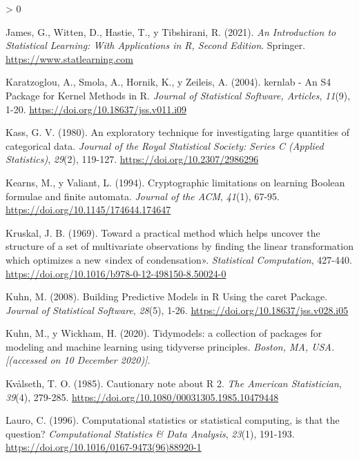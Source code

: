 \documentclass[
  spanish,
]{book}
\theoremstyle{break}
\newlength{\cslhangindent}
\newenvironment{CSLReferences}[2] %
 {%
  \setlength{\parindent}{0pt}
  \ifodd #1 \everypar{\setlength{\hangindent}{\cslhangindent}}\ignorespaces\fi
  \ifnum #2 > 0
  \setlength{\parskip}{#2\baselineskip}
  \fi
 }%
 {}
\theoremstyle{definition}
\theoremstyle{definition}
\theoremstyle{definition}
\theoremstyle{definition}
\theoremstyle{remark}
\begin{document}
\begin{CSLReferences}{1}{0}
\leavevmode\hypertarget{ref-james2021introduction}{}%
James, G., Witten, D., Hastie, T., y Tibshirani, R. (2021). \emph{An Introduction to Statistical Learning: With Applications in R, Second Edition}. Springer. \url{https://www.statlearning.com}

\leavevmode\hypertarget{ref-kernlab2004}{}%
Karatzoglou, A., Smola, A., Hornik, K., y Zeileis, A. (2004). kernlab - An S4 Package for Kernel Methods in R. \emph{Journal of Statistical Software, Articles}, \emph{11}(9), 1-20. \url{https://doi.org/10.18637/jss.v011.i09}

\leavevmode\hypertarget{ref-kass1980exploratory}{}%
Kass, G. V. (1980). An exploratory technique for investigating large quantities of categorical data. \emph{Journal of the Royal Statistical Society: Series C (Applied Statistics)}, \emph{29}(2), 119-127. \url{https://doi.org/10.2307/2986296}

\leavevmode\hypertarget{ref-kearns_cryptographic_1994}{}%
Kearns, M., y Valiant, L. (1994). Cryptographic limitations on learning {Boolean} formulae and finite automata. \emph{Journal of the ACM}, \emph{41}(1), 67-95. \url{https://doi.org/10.1145/174644.174647}

\leavevmode\hypertarget{ref-kruskal1969toward}{}%
Kruskal, J. B. (1969). Toward a practical method which helps uncover the structure of a set of multivariate observations by finding the linear transformation which optimizes a new {«index of condensation»}. \emph{Statistical Computation}, 427-440. \url{https://doi.org/10.1016/b978-0-12-498150-8.50024-0}

\leavevmode\hypertarget{ref-kuhn2008building}{}%
Kuhn, M. (2008). Building Predictive Models in R Using the caret Package. \emph{Journal of Statistical Software}, \emph{28}(5), 1-26. \url{https://doi.org/10.18637/jss.v028.i05}

\leavevmode\hypertarget{ref-kuhn2020tidymodels}{}%
Kuhn, M., y Wickham, H. (2020). Tidymodels: a collection of packages for modeling and machine learning using tidyverse principles. \emph{Boston, MA, USA.{[}(accessed on 10 December 2020){]}}.

\leavevmode\hypertarget{ref-kvaalseth1985cautionary}{}%
Kvålseth, T. O. (1985). Cautionary note about R 2. \emph{The American Statistician}, \emph{39}(4), 279-285. \url{https://doi.org/10.1080/00031305.1985.10479448}

\leavevmode\hypertarget{ref-lauro1996computational}{}%
Lauro, C. (1996). Computational statistics or statistical computing, is that the question? \emph{Computational Statistics \& Data Analysis}, \emph{23}(1), 191-193. \url{https://doi.org/10.1016/0167-9473(96)88920-1}


\end{CSLReferences}
\end{document}

